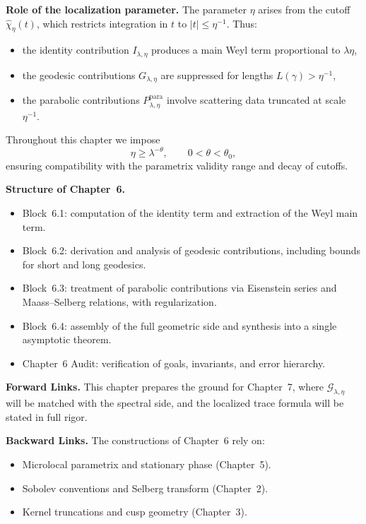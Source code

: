 \medskip

\noindent\textbf{Role of the localization parameter.}
The parameter $\eta$ arises from the cutoff $\widehat{\chi}_\eta(t)$,
which restricts integration in $t$ to $|t|\le \eta^{-1}$.
Thus:
\begin{itemize}
  \item the identity contribution $I_{\lambda,\eta}$ produces a main Weyl term proportional to $\lambda\eta$,
  \item the geodesic contributions $G_{\lambda,\eta}$ are suppressed for lengths $L(\gamma)>\eta^{-1}$,
  \item the parabolic contributions $P^{\mathrm{para}}_{\lambda,\eta}$ involve scattering data truncated at scale $\eta^{-1}$.
\end{itemize}
Throughout this chapter we impose
\[
  \eta \ge \lambda^{-\theta}, \qquad 0<\theta<\theta_0,
\]
ensuring compatibility with the parametrix validity range and decay of cutoffs.

\medskip

\noindent\textbf{Structure of Chapter~6.}
\begin{itemize}
  \item Block~6.1: computation of the identity term and extraction of the Weyl main term.
  \item Block~6.2: derivation and analysis of geodesic contributions, including bounds for short and long geodesics.
  \item Block~6.3: treatment of parabolic contributions via Eisenstein series and Maass–Selberg relations, with regularization.
  \item Block~6.4: assembly of the full geometric side and synthesis into a single asymptotic theorem.
  \item Chapter~6 Audit: verification of goals, invariants, and error hierarchy.
\end{itemize}

\medskip

\noindent\textbf{Forward Links.}
This chapter prepares the ground for Chapter~7,
where $\mathcal{G}_{\lambda,\eta}$ will be matched with the spectral side,
and the localized trace formula will be stated in full rigor.

\medskip

\noindent\textbf{Backward Links.}
The constructions of Chapter~6 rely on:
\begin{itemize}
  \item Microlocal parametrix and stationary phase (Chapter~5).
  \item Sobolev conventions and Selberg transform (Chapter~2).
  \item Kernel truncations and cusp geometry (Chapter~3).
\end{itemize}

